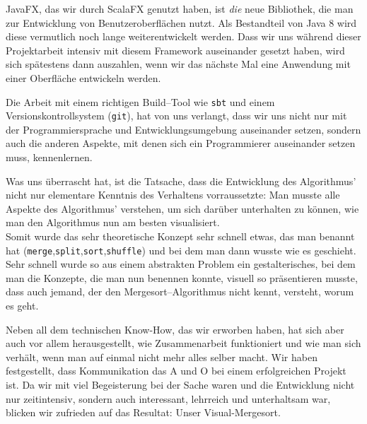 JavaFX, das wir durch ScalaFX genutzt haben, ist \textit{die} neue Bibliothek, die man zur Entwicklung von Benutzeroberflächen nutzt. Als Bestandteil von Java 8 wird diese vermutlich noch lange weiterentwickelt werden. Dass wir uns während dieser Projektarbeit intensiv mit diesem Framework auseinander gesetzt haben, wird sich spätestens dann auszahlen, wenn wir das nächste Mal eine Anwendung mit einer Oberfläche entwickeln werden.

Die Arbeit mit einem richtigen Build--Tool wie \texttt{sbt} und einem Versionskontrollsystem (\texttt{git}), hat von uns verlangt, dass wir uns nicht nur mit der Programmiersprache und Entwicklungsumgebung auseinander setzen, sondern auch die anderen Aspekte, mit denen sich ein Programmierer auseinander setzen muss, kennenlernen.

Was uns überrascht hat, ist die Tatsache, dass die Entwicklung des Algorithmus' nicht nur elementare Kenntnis des Verhaltens vorraussetzte: Man musste alle Aspekte des Algorithmus' verstehen, um sich darüber unterhalten zu können, wie man den Algorithmus nun am besten visualisiert.\\
Somit wurde das sehr theoretische Konzept sehr schnell etwas, das man benannt hat (\texttt{merge},\texttt{split},\texttt{sort},\texttt{shuffle}) und bei dem man dann wusste wie es geschieht. Sehr schnell wurde so aus einem abstrakten Problem ein gestalterisches, bei dem man die Konzepte, die man nun benennen konnte, visuell so präsentieren musste, dass auch jemand, der den Mergesort--Algorithmus nicht kennt, versteht, worum es geht.

Neben all dem technischen Know-How, das wir erworben haben, hat sich aber auch vor allem herausgestellt, wie Zusammenarbeit funktioniert und wie man sich verhält, wenn man auf einmal nicht mehr alles selber macht. Wir haben festgestellt, dass Kommunikation das A und O bei einem erfolgreichen Projekt ist. Da wir mit viel Begeisterung bei der Sache waren und die Entwicklung nicht nur zeitintensiv, sondern auch interessant, lehrreich und unterhaltsam war, blicken wir zufrieden auf das Resultat: Unser Visual-Mergesort.
